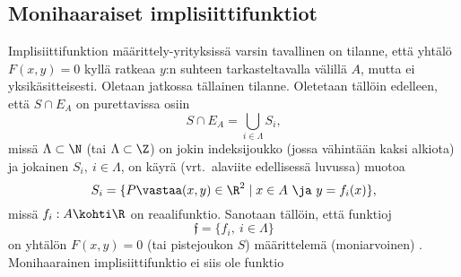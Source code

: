 \subsection*{Monihaaraiset implisiittifunktiot}

Implisiittifunktion määrittely-yrityksissä varsin tavallinen on tilanne, että yhtälö $F(x,y)=0$
kyllä ratkeaa $y$:n suhteen tarkasteltavalla välillä $A$, mutta ei yksikäsitteisesti. Oletaan
jatkossa tällainen tilanne. Oletetaan tällöin edelleen, että $S\cap E_A$ on purettavissa osiin
\[
S\cap E_A = \bigcup_{i\in \Lambda} S_i,
\]
missä $\Lambda \subset \N$ (tai $\Lambda \subset \Z$) on jokin indeksijoukko (jossa vähintään
kaksi alkiota) ja jokainen $S_i,\ i \in \Lambda$, on käyrä (vrt.\ alaviite edellisessä luvussa)
muotoa
\[
S_i=\{P \vastaa (x,y) \in \R^2 \mid x \in A \ \ja \ y=f_i(x)\},
\]
missä $f_i: A \kohti \R$ on reaalifunktio. Sanotaan tällöin, että funktioj
\[
\mathfrak{f}=\{f_i, \ i \in \Lambda \}
\]
on yhtälön $F(x,y)=0$ (tai pistejoukon $S$) määrittelemä  (moniarvoinen)
. Monihaarainen implisiittifunktio ei siis ole funktio

\pagebreak 

